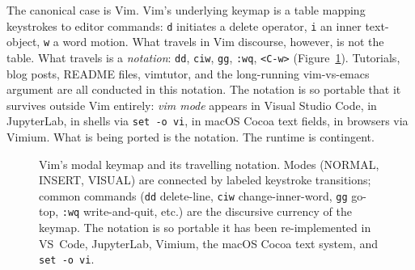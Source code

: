 \documentclass[10pt,letterpaper,twocolumn]{article}
\begin{document}
The canonical case is Vim. Vim's underlying keymap is a table mapping keystrokes to editor commands: \texttt{d} initiates a delete operator, \texttt{i} an inner text-object, \texttt{w} a word motion. What travels in Vim discourse, however, is not the table. What travels is a \emph{notation}: \texttt{dd}, \texttt{ciw}, \texttt{gg}, \texttt{:wq}, \texttt{<C-w>} (Figure~\ref{fig:vim-modes}). Tutorials, blog posts, README files, vimtutor, and the long-running vim-vs-emacs argument are all conducted in this notation. The notation is so portable that it survives outside Vim entirely: \emph{vim mode} appears in Visual Studio Code, in JupyterLab, in shells via \texttt{set -o vi}, in macOS Cocoa text fields, in browsers via Vimium. What is being ported is the notation. The runtime is contingent.

\begin{figure}[t]
\centering
{}
\caption{Vim's modal keymap and its travelling notation. Modes (NORMAL, INSERT, VISUAL) are connected by labeled keystroke transitions; common commands (\texttt{dd} delete-line, \texttt{ciw} change-inner-word, \texttt{gg} go-top, \texttt{:wq} write-and-quit, etc.) are the discursive currency of the keymap. The notation is so portable it has been re-implemented in VS~Code, JupyterLab, Vimium, the macOS Cocoa text system, and \texttt{set -o vi}.}
\label{fig:vim-modes}
\end{figure}
\end{document}
